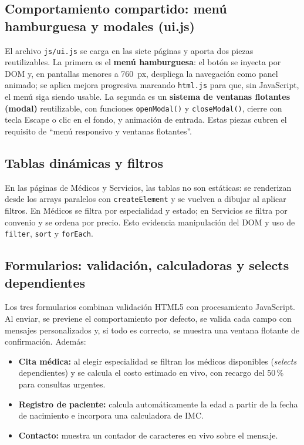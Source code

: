 \documentclass[11pt,a4paper]{article}
\begin{document}
\subsection{Comportamiento compartido: menú hamburguesa y modales (ui.js)}
El archivo \texttt{js/ui.js} se carga en las siete páginas y aporta dos piezas reutilizables. La primera es el \textbf{menú hamburguesa}: el botón se inyecta por DOM y, en pantallas menores a 760~px, despliega la navegación como panel animado; se aplica mejora progresiva marcando \lstinline|html.js| para que, sin JavaScript, el menú siga siendo usable. La segunda es un \textbf{sistema de ventanas flotantes (modal)} reutilizable, con funciones \lstinline|openModal()| y \lstinline|closeModal()|, cierre con tecla Escape o clic en el fondo, y animación de entrada. Estas piezas cubren el requisito de ``menú responsivo y ventanas flotantes''.

\subsection{Tablas dinámicas y filtros}
En las páginas de Médicos y Servicios, las tablas no son estáticas: se renderizan desde los arrays paralelos con \lstinline|createElement| y se vuelven a dibujar al aplicar filtros. En Médicos se filtra por especialidad y estado; en Servicios se filtra por convenio y se ordena por precio. Esto evidencia manipulación del DOM y uso de \lstinline|filter|, \lstinline|sort| y \lstinline|forEach|.

\subsection{Formularios: validación, calculadoras y selects dependientes}
Los tres formularios combinan validación HTML5 con procesamiento JavaScript. Al enviar, se previene el comportamiento por defecto, se valida cada campo con mensajes personalizados y, si todo es correcto, se muestra una ventana flotante de confirmación. Además:
\begin{itemize}
  \item \textbf{Cita médica:} al elegir especialidad se filtran los médicos disponibles (\emph{selects} dependientes) y se calcula el costo estimado en vivo, con recargo del 50\,\% para consultas urgentes.
  \item \textbf{Registro de paciente:} calcula automáticamente la edad a partir de la fecha de nacimiento e incorpora una calculadora de IMC.
  \item \textbf{Contacto:} muestra un contador de caracteres en vivo sobre el mensaje.
\end{itemize}
\end{document}
